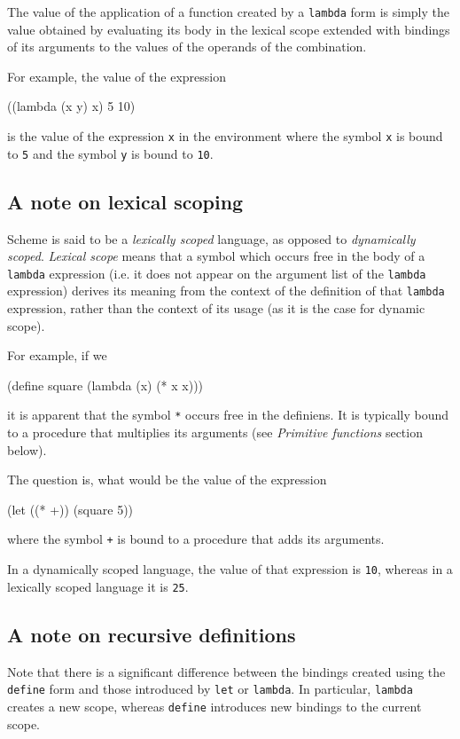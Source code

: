 The value of the application of a function created by a \texttt{lambda}
form is simply the value obtained by evaluating its body in the lexical
scope extended with bindings of its arguments to the values of the
operands of the combination.

For example, the value of the expression
\begin{Snippet}
((lambda (x y) x) 5 10)
\end{Snippet}
is the value of the expression \texttt{x} in the environment where
the symbol \texttt{x} is bound to \texttt{5} and the symbol \texttt{y}
is bound to \texttt{10}.

\subsection{A note on lexical scoping}

Scheme is said to be a \emph{lexically scoped} language, as opposed
to \emph{dynamically scoped}. \emph{Lexical scope} means
that a symbol which occurs free in the body of a \texttt{lambda}
expression (i.e. it does not appear on the argument list of the
\texttt{lambda} expression) derives its meaning from the context
of the definition of that \texttt{lambda} expression, rather than
the context of its usage (as it is the case for dynamic scope).

For example, if we
\begin{Snippet}
(define square (lambda (x) (* x x)))
\end{Snippet}
it is apparent that the symbol \texttt{*} occurs free in the
definiens. It is typically bound to a procedure that multiplies
its arguments (see \emph{Primitive functions} section below).

The question is, what would be the value of the expression
\begin{Snippet}
(let ((* +))
  (square 5))
\end{Snippet}

where the symbol \texttt{+} is bound to a procedure that adds
its arguments.

In a dynamically scoped language, the value of that expression
is \texttt{10}, whereas in a lexically scoped language it is \texttt{25}.

\subsection{A note on recursive definitions}

Note that there is a significant difference between the bindings created
using the \texttt{define} form and those introduced by
\texttt{let} or \texttt{lambda}. In particular, \texttt{lambda} creates
a new scope, whereas \texttt{define} introduces new bindings to the
current scope.

